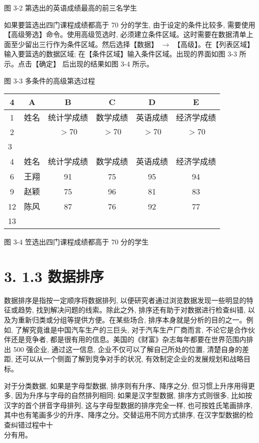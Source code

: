\documentclass[10pt]{article}
\begin{document}
\begin{CJK*}{UTF8}{bsmi}
图 3-2 第选出的英语成绩最高的前三名学生

如果要篮选出四门课程成绩都高于 70 分的学生, 由于设定的条件比较多, 需要使用【高级篣选】命令。使用高级笕选时, 必须建立条件区域。这时需要在数据清单上面至少留出三行作为条件区域。然后选择【数据】 $\rightarrow$ 【高级】。在【列表区域】输入要篮选的数据区域; 在【条件区域】输入条件区域。出现的界面如图 3-3 所示。点击【确定】 后出现的结果如图 3-4 所示。

\begin{center}
\end{center}

图 3-3 多条件的高级第选过程

\begin{center}
\begin{tabular}{|c|c|c|c|c|c|}
\hline
4 & A & B & C & D & E \\
\hline
1 & 姓名 & 统计学成绩 & 数学成绩 & 英语成绩 & 经济学成绩 \\
\hline
2 &  & $>70$ & $>70$ & $>70$ & $>70$ \\
\hline
\multicolumn{6}{|l|}{3} \\
\hline
4 & 姓名 & 统计学成绩 & 数学成绩 & 英语成绩 & 经济学成绩 \\
\hline
6 & 王翔 & 91 & 75 & 95 & 94 \\
\hline
9 & 赵颖 & 75 & 96 & 81 & 83 \\
\hline
12 & 陈风 & 87 & 76 & 92 & 77 \\
\hline
13 &  &  &  &  &  \\
\hline
\end{tabular}
\end{center}

图 3-4 笠选出四门课程成绩都高于 70 分的学生

\section*{3. 1.3 数据排序}
数据排序是指按一定顺序将数据排列, 以便研究者通过浏览数据发现一些明显的特征或趋势, 找到解决问题的线索。除此之外, 排序还有助于对数据进行检查纠错, 以及为重新归类或分组等提供方便。在某些场合, 排序本身就是分析的目的之一。例如, 了解究竟谁是中国汽车生产的三巨头, 对于汽车生产厂商而言, 不论它是合作伙伴还是竞争者, 都是很有用的信息。美国的《财富》杂志每年都要在世界范围内排出 500 强企业, 通过这一信息, 企业不仅可以了解自己所处的位置, 清楚自身的差距, 还可以从一个侧面了解到竞争对手的状况, 有效制定企业的发展规划和战略目标。

对于分类数据, 如果是字母型数据, 排序则有升序、降序之分, 但习惯上升序用得更多, 因为升序与字母的自然排列相同; 如果是汉字型数据, 排序方式则很多, 比如按汉字的首个拼音字母排列, 这与字母型数据的排序完全一样, 也可按姓氏笔画排序, 其中也有笔画多少的升序、降序之分。交替运用不同方式排序, 在汉字型数据的检查纠错过程中十\\
分有用。


\end{CJK*}
\end{document}

